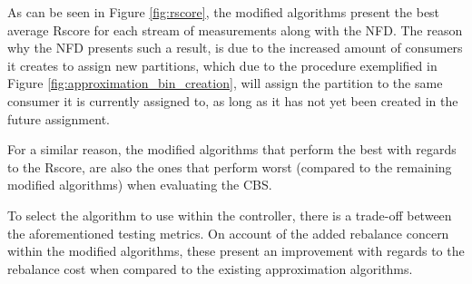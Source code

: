 As can be seen in Figure \ref{fig:rscore}, the modified algorithms present the
best average Rscore for each stream of measurements along with the NFD. The
reason why the NFD presents such a result, is due to the increased amount of
consumers it creates to assign new partitions, which due to the procedure
exemplified in Figure \ref{fig:approximation_bin_creation}, will assign the
partition to the same consumer it is currently assigned to, as long as it has
not yet been created in the future assignment.

For a similar reason, the modified algorithms that perform the best with regards
to the Rscore, are also the ones that perform worst (compared to the remaining
modified algorithms) when evaluating the CBS.

To select the algorithm to use within the controller, there is a trade-off
between the aforementioned testing metrics. On account of the added rebalance
concern within the modified algorithms, these present an improvement with
regards to the rebalance cost when compared to the existing approximation
algorithms.


